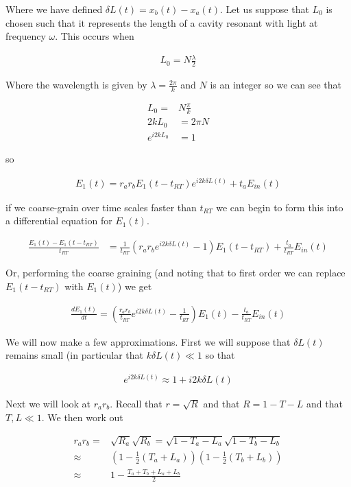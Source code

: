 \documentclass[12pt]{article}
\begin{document}
Where we have defined $\delta L(t) = x_b(t)-x_a(t)$.
Let us suppose that $L_0$ is chosen such that it represents the length of a cavity resonant with light at frequency $\omega$.
This occurs when

\begin{align}
L_0 = N \frac{\lambda}{2}
\end{align}

Where the wavelength is given by $\lambda = \frac{2\pi}{k}$ and $N$ is an integer so we can see that

\begin{align}
L_0 =& N \frac{\pi}{k}\\
2kL_0 &= 2\pi N\\
e^{i2kL_0} &= 1
\end{align}

so

\begin{align}
E_1(t) = r_ar_bE_1(t-t_{RT})e^{i2k\delta L(t)} + t_aE_{in}(t)
\end{align}

if we coarse-grain over time scales faster than $t_{RT}$ we can begin to form this into a differential equation for $E_1(t)$.

\begin{align}
\frac{E_1(t) - E_1(t-t_{RT})}{t_{RT}} &= \frac{1}{t_{RT}}\left(r_ar_b e^{i2k\delta L(t)} - 1\right)E_1(t-t_{RT}) + \frac{t_a}{t_{RT}}E_{in}(t)
\end{align}

Or, performing the coarse graining (and noting that to first order we can replace $E_1(t-t_{RT})$ with $E_1(t)$) we get

\begin{align}
\frac{dE_1(t)}{dt} = \left(\frac{r_ar_b}{t_{RT}}e^{i2k\delta L(t)} - \frac{1}{t_{RT}}\right)E_1(t) - \frac{t_a}{t_{RT}}E_{in}(t)
\end{align}

We will now make a few approximations. 
First we will suppose that $\delta L(t)$ remains small (in particular that $k\delta L(t) \ll 1$ so that

\begin{align}
e^{i2k\delta L(t)} \approx 1 + i2k \delta L(t)
\end{align}

Next we will look at $r_ar_b$. 
Recall that $r = \sqrt{R}$ and that $R=1-T-L$ and that $T, L \ll 1$. 
We then work out

\begin{align}
r_ar_b =& \sqrt{R_a}\sqrt{R_b} = \sqrt{1-T_a-L_a}\sqrt{1-T_b-L_b}\\
\approx& \left(1-\frac{1}{2}\left(T_a+L_a\right)\right)\left(1-\frac{1}{2}\left(T_b+L_b\right)\right)\\
\approx& 1 - \frac{T_a+T_b+L_a+L_b}{2}
\end{align}
\end{document}
